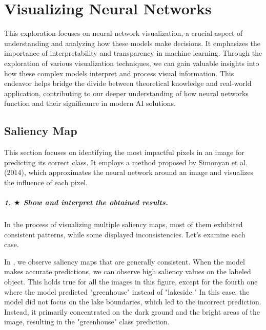 \chapter{Visualizing Neural Networks}
\graphicspath{{figs/2b/}}

This exploration focuses on neural network visualization, a crucial aspect of understanding and analyzing how these models make decisions. It emphasizes the importance of interpretability and transparency in machine learning. Through the exploration of various visualization techniques, we can gain valuable insights into how these complex models interpret and process visual information. This endeavor helps bridge the divide between theoretical knowledge and real-world application, contributing to our deeper understanding of how neural networks function and their significance in modern AI solutions.

\section{Saliency Map}

This section focuses on identifying the most impactful pixels in an image for predicting its correct class. It employs a method proposed by Simonyan et al. (2014), which approximates the neural network around an image and visualizes the influence of each pixel.

\paragraph*{1. $ \bigstar $ Show and interpret the obtained results.}
In the process of visualizing multiple saliency maps, most of them exhibited consistent patterns, while some displayed inconsistencies. Let's examine each case.


In , we observe saliency maps that are generally consistent. When the model makes accurate predictions, we can observe high saliency values on the labeled object. This holds true for all the images in this figure, except for the fourth one where the model predicted "greenhouse" instead of "lakeside." In this case, the model did not focus on the lake boundaries, which led to the incorrect prediction. Instead, it primarily concentrated on the dark ground and the bright areas of the image, resulting in the "greenhouse" class prediction.


